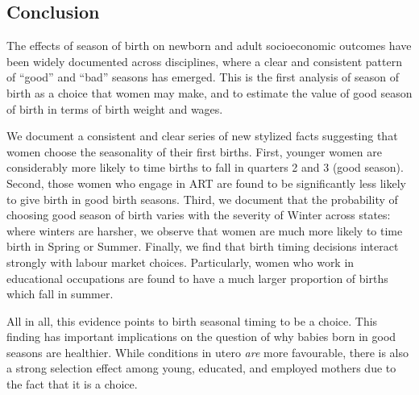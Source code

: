 \documentclass[a4paper, 12 pt]{article}
\theoremstyle{plain}
\begin{document}
\begin{doublespace}
\section{Conclusion}
The effects of season of birth on newborn and adult socioeconomic outcomes have been widely documented across disciplines, where a clear and consistent pattern of ``good'' and ``bad'' seasons has emerged. This is the first analysis of season of birth as a choice that women may make, and to estimate the value of good season of birth in terms of birth weight and wages.

We document a consistent and clear series of new stylized facts suggesting that women choose the seasonality of their first births.  First, younger women are considerably more likely to time births to fall in quarters 2 and 3 (good season). Second, those women who engage in ART are found to be significantly less likely to give birth in good birth seasons. Third, we document that the probability of choosing good season of birth varies with the severity of Winter across states: where winters are harsher, we observe that women are much more likely to time birth in Spring or Summer. Finally, we find that birth timing decisions interact strongly with labour market choices.  Particularly, women who work in educational occupations are found to have a much larger proportion of births which fall in summer.

All in all, this evidence points to birth seasonal timing to be a choice. This finding has important implications on the question of why babies born in good seasons are healthier.  While conditions in utero \emph{are} more favourable, there is also a strong selection effect among young, educated, and employed mothers due to the fact that it is a choice.


\newpage


\end{doublespace}
\end{document}
